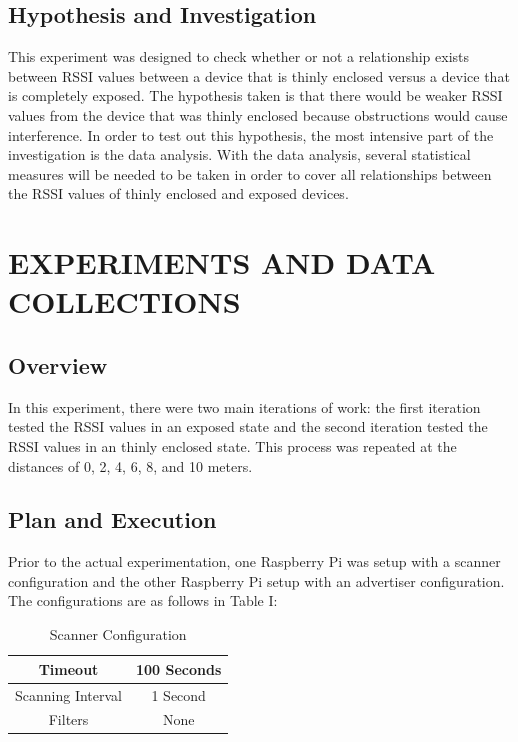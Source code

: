 \documentclass[letterpaper, 10 pt, conference]{ieeeconf}  %
\begin{document}
\subsection{Hypothesis and Investigation}

This experiment was designed to check whether or not a relationship exists between RSSI values between a device that is thinly enclosed versus a device that is completely exposed. The hypothesis taken is that there would be weaker RSSI values from the device that was thinly enclosed because obstructions would cause interference.
\smallbreak
In order to test out this hypothesis, the most intensive part of the investigation is the data analysis. With the data analysis, several statistical measures will be needed to be taken in order to cover all relationships between the RSSI values of thinly enclosed and exposed devices.

\section{EXPERIMENTS AND DATA COLLECTIONS}

\subsection{Overview}
In this experiment, there were two main iterations of work: the first iteration tested the RSSI values in an exposed state and the second iteration tested the RSSI values in an thinly enclosed state. This process was repeated at the distances of 0, 2, 4, 6, 8, and 10 meters.

\subsection{Plan and Execution}
Prior to the actual experimentation, one Raspberry Pi was setup with a scanner configuration and the other Raspberry Pi setup with an advertiser configuration. The configurations are as follows in Table I:

\begin{table}[h]
\caption{Scanner Configuration}
\label{table_example}
\begin{center}
\begin{tabular}{|c|c|}
\hline
Timeout & 100 Seconds\\
\hline
Scanning Interval & 1 Second\\
\hline
Filters & None\\
\hline
\end{tabular}
\end{center}
\end{table}
\end{document}
